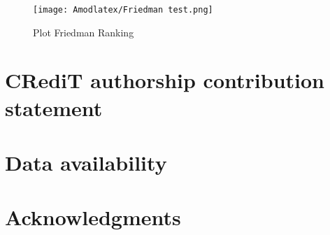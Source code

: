 \documentclass[a4paper,fleqn]{cas-sc}
\begin{document}
\begin{figure}[!ht]
\centering
\texttt{[image: Amodlatex/Friedman test.png]}
\caption{Plot Friedman Ranking}
\label{Line plot12}
\end{figure}



\section*{CRediT authorship contribution statement}
\section*{Data availability}
\section*{Acknowledgments}
\label{}

\end{document}

